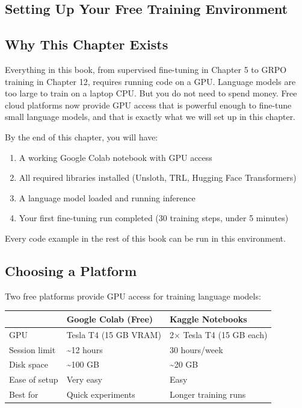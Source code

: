 \begin{chapterenv}

\chapter{Setting Up Your Free Training Environment}

\section{Why This Chapter Exists}

Everything in this book, from supervised fine-tuning in Chapter 5 to GRPO training in Chapter 12, requires running code on a GPU. Language models are too large to train on a laptop CPU. But you do not need to spend money. Free cloud platforms now provide GPU access that is powerful enough to fine-tune small language models, and that is exactly what we will set up in this chapter.

By the end of this chapter, you will have:

\begin{enumerate}[nosep]
    \item A working Google Colab notebook with GPU access
    \item All required libraries installed (Unsloth, TRL, Hugging Face Transformers)
    \item A language model loaded and running inference
    \item Your first fine-tuning run completed (30 training steps, under 5 minutes)
\end{enumerate}

Every code example in the rest of this book can be run in this environment.

\section{Choosing a Platform}

Two free platforms provide GPU access for training language models:

\begin{center}
\begin{tabular}{p{}p{}p{}}
\toprule
& \textbf{Google Colab (Free)} & \textbf{Kaggle Notebooks} \\
\midrule
GPU & Tesla T4 (15 GB VRAM) & 2$\times$ Tesla T4 (15 GB each) \\
Session limit & \textasciitilde12 hours & 30 hours/week \\
Disk space & \textasciitilde100 GB & \textasciitilde20 GB \\
Ease of setup & Very easy & Easy \\
Best for & Quick experiments & Longer training runs \\
\bottomrule
\end{tabular}
\end{center}


\end{chapterenv}
